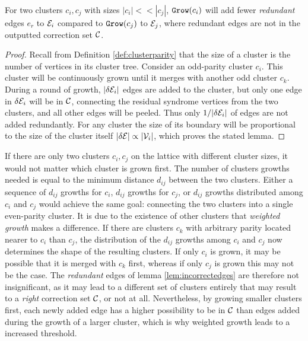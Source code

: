

\begin{lemma}\label{lem:incorrectedges}
  For two clusters $c_i, c_j$ with sizes $|c_i| << |c_j|$, $\texttt{Grow}(c_i)$ will add fewer \emph{redundant} edges $e_r$ to $\mathcal{E}_i$ compared to $\texttt{Grow}(c_j)$ to $\mathcal{E}_j$, where redundant edges are not in the outputted correction set $\mathcal{C}$. 
\end{lemma}
\begin{proof}
  Recall from Definition \ref{def:clusterparity} that the size of a cluster is the number of vertices in its cluster tree. Consider an odd-parity cluster $c_i$. This cluster will be continuously grown until it merges with another odd cluster $c_k$. During a round of growth, $|\delta \mathcal{E}_i|$ edges are added to the cluster, but only one edge in $\delta \mathcal{E}_i$ will be in $\mathcal{C}$, connecting the residual syndrome vertices from the two clusters, and all other edges will be peeled. Thus only $1/|\delta \mathcal{E}_i|$ of edges are not added redundantly. For any cluster the size of its boundary will be proportional to the size of the cluster itself $|\delta \mathcal{E}| \propto |\mathcal{V}_i|$, which proves the stated lemma. 
\end{proof}

If there are only two clusters $c_i, c_j$ on the lattice with different cluster sizes, it would not matter which cluster is grown first. The number of clusters growths needed is equal to the minimum distance $d_{ij}$ between the two clusters. Either a sequence of $d_{ij}$ growths for $c_i$, $d_{ij}$ growths for $c_j$, or $d_{ij}$ growths distributed among $c_i$ and $c_j$ would achieve the same goal: connecting the two clusters into a single even-parity cluster. It is due to the existence of other clusters that \emph{weighted growth} makes a difference. If there are clusters $c_k$ with arbitrary parity located nearer to $c_i$ than $c_j$, the distribution of the $d_{ij}$ growths among $c_i$ and $c_j$ now determines the shape of the resulting clusters. If only $c_i$ is grown, it may be possible that it is merged with $c_k$ first, whereas if only $c_j$ is grown this may not be the case. The \emph{redundant} edges of lemma \ref{lem:incorrectedges} are therefore not insignificant, as it may lead to a different set of clusters entirely that may result to a \emph{right} correction set $\mathcal{C}$, or not at all. Nevertheless, by growing smaller clusters first, each newly added edge has a higher possibility to be in $\mathcal{C}$ than edges added during the growth of a larger cluster, which is why weighted growth leads to a increased threshold.


